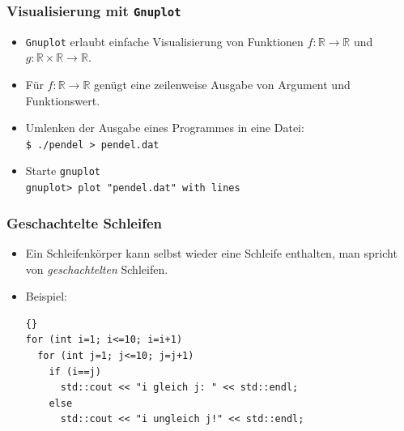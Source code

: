 \documentclass[ignorenonframetext,12pt]{beamer}
\theoremstyle{definition}
\theoremstyle{definition}
\begin{document}
\begin{frame}
\frametitle{Visualisierung mit \lstinline{Gnuplot}}
\begin{itemize}
\item \lstinline{Gnuplot} erlaubt einfache Visualisierung von Funktionen
  $f:\mathbb{R}\to\mathbb{R}$ und
  $g:\mathbb{R}\times\mathbb{R}\to\mathbb{R}$.
\item Für  $f:\mathbb{R}\to\mathbb{R}$ genügt eine zeilenweise Ausgabe
  von Argument und Funktionswert.
\item Umlenken der Ausgabe eines Programmes in eine Datei:\\
\lstinline{$ ./pendel > pendel.dat}
\item Starte \lstinline{gnuplot}\\
\lstinline{gnuplot> plot "pendel.dat" with lines}
\end{itemize}
\end{frame}


\begin{frame}[fragile]
\frametitle{Geschachtelte Schleifen}
\begin{itemize}
\item Ein Schleifenkörper kann selbst wieder eine Schleife enthalten,
  man spricht von \textsl{geschachtelten} Schleifen.
\item Beispiel:
{\scriptsize\begin{lstlisting}{}
for (int i=1; i<=10; i=i+1)
  for (int j=1; j<=10; j=j+1)
    if (i==j)
      std::cout << "i gleich j: " << std::endl;
    else
      std::cout << "i ungleich j!" << std::endl;
\end{lstlisting}}
\end{itemize}
\end{frame}
\end{document}
